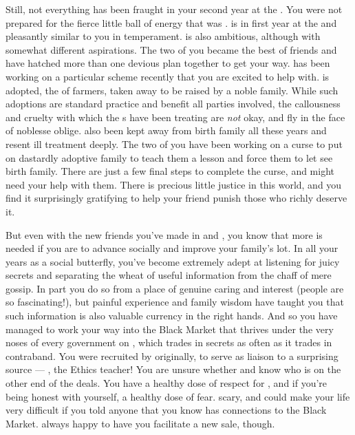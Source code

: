 \documentclass[char]{GL2020}
\begin{document}
Still, not everything has been fraught in your second year at the \pSchool{}. You were not prepared for the fierce little ball of energy that was \cAdopted{\intro}. \cAdopted{} is in \cAdopted{\their} first year at the \pSc{} and \cAdopted{\theyare} pleasantly similar to you in temperament. \cAdopted{} is also ambitious, although with somewhat different aspirations. The two of you became the best of friends and have hatched more than one devious plan together to get your way. \cAdopted{} has been working on a particular scheme recently that you are excited to help with. \cAdopted{} is adopted, the \cAdopted{\offspring} of farmers, taken away to be raised by a noble family. While such adoptions are standard practice and benefit all parties involved, the callousness and cruelty with which the \cAdopted{\formal}s have been treating \cAdopted{} are \emph{not} okay, and fly in the face of noblesse oblige. \cAdopted{} \cAdopted{\have} also been kept away from \cAdopted{\their} birth family all these years and \cAdopted{\they} resent\cAdopted{\verbs} \cAdopted{\their} ill treatment deeply. The two of you have been working on a curse to put on \cAdopted{\their} dastardly adoptive family to teach them a lesson and force them to let \cAdopted{} see \cAdopted{\their} birth family. There are just a few final steps to complete the curse, and \cAdopted{} might need your help with them. There is precious little justice in this world, and you find it surprisingly gratifying to help your friend punish those who richly deserve it.

But even with the new friends you’ve made in \cAdopted{} and \cPresident{}, you know that more is needed if you are to advance socially and improve your family’s lot. In all your years as a social butterfly, you’ve become extremely adept at listening for juicy secrets and separating the wheat of useful information from the chaff of mere gossip. In part you do so from a place of genuine caring and interest (people are so fascinating!), but painful experience and family wisdom have taught you that such information is also valuable currency in the right hands.  And so you have managed to work your way into the Black Market that thrives under the very noses of every government on \pEarth{}, which trades in secrets as often as it trades in contraband. You were recruited by \cChupSecond{\full} originally, to serve as liaison to a surprising source — \cEthics{\full}, the Ethics teacher! You are unsure whether \cEthics{} and \cChupSecond{} know who is on the other end of the deals. You have a healthy dose of respect for \cChupSecond{}, and if you're being honest with yourself, a healthy dose of fear. \cChupSecond{\Theyare} scary, and could make your life very difficult if you told anyone that you know \cChupSecond{} has connections to the Black Market. \cChupSecond{\Theyare} always happy to have you facilitate a new sale, though. 
\end{document}
